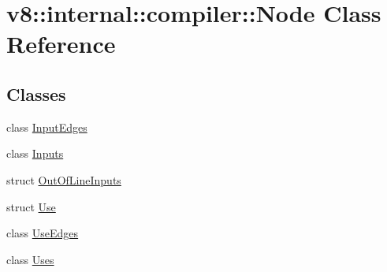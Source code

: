 \hypertarget{classv8_1_1internal_1_1compiler_1_1_node}{}\section{v8\+:\+:internal\+:\+:compiler\+:\+:Node Class Reference}
\label{classv8_1_1internal_1_1compiler_1_1_node}
\subsection*{Classes}
\begin{DoxyCompactItemize}
\item 
class \hyperlink{classv8_1_1internal_1_1compiler_1_1_node_1_1_input_edges}{Input\+Edges}
\item 
class \hyperlink{classv8_1_1internal_1_1compiler_1_1_node_1_1_inputs}{Inputs}
\item 
struct \hyperlink{structv8_1_1internal_1_1compiler_1_1_node_1_1_out_of_line_inputs}{Out\+Of\+Line\+Inputs}
\item 
struct \hyperlink{structv8_1_1internal_1_1compiler_1_1_node_1_1_use}{Use}
\item 
class \hyperlink{classv8_1_1internal_1_1compiler_1_1_node_1_1_use_edges}{Use\+Edges}
\item 
class \hyperlink{classv8_1_1internal_1_1compiler_1_1_node_1_1_uses}{Uses}
\end{DoxyCompactItemize}
